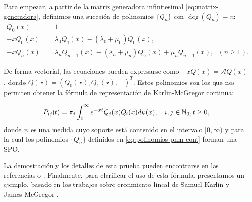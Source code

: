     Para empezar, a partir de la matriz generadora infinitesimal \eqref{eq:matrix-generadora}, definimos una sucesión de polinomios $\{Q_n\}$ con $\deg(Q_n)=n$:
    \begin{equation}
        \label{eq:polinomios-pnm-cont}
        \begin{split}
            Q_{0}(x) &= 1 \\
            -xQ_0(x)&=\lambda_0 Q_1(x) -(\lambda_0 + \mu_0) Q_0(x), \\
            -x Q_n(x) &= \lambda_n Q_{n+1}(x) -(\lambda_n+\mu_n) Q_n(x) + \mu_n Q_{n-1}(x), \ \ \ (n\geq 1).
        \end{split}
    \end{equation}

    De forma vectorial, las ecuaciones pueden expresarse como $-x Q(x)=\mathcal{A} Q(x)$, donde $Q(x)=(Q_0(x), Q_1(x),\dots)^T$. Estos polinomios son los que nos permiten obtener la fórmula de representación de Karlin-McGregor continua:

    \begin{equation}
        \label{eq:formula-representacion-cont}
        P_{ij}(t)=\pi_j \int_{0}^\infty e^{-xt} Q_j(x)Q_i(x)d\psi(x), \ \ \ i,j\in\N_0, t\geq 0,
    \end{equation}
    donde $\psi$ es una medida cuyo soporte está contenido en el intervalo $[0,\infty)$ y para la cual los polinomios $\{Q_n\}$ definidos en \eqref{eq:polinomios-pnm-cont} forman una SPO.
    
    La demostración y los detalles de esta prueba pueden encontrarse en las referencias \cite{differential-equations} o \cite[Section 3.2]{Manuel}. Finalmente, para clarificar el uso de esta fórmula, presentamos un ejemplo, basado en los trabajos sobre crecimiento lineal de Samuel Karlin y James McGregor \cite{Linear-Growth}.
    
